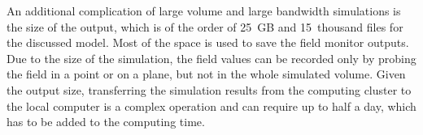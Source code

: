 An additional complication of large volume and large bandwidth simulations is the size of the output, which is of the order of 25~GB and 15~thousand files for the discussed model. Most of the space is used to save the field monitor outputs. Due to the size of the simulation, the field values can be recorded only by probing the field in a point or on a plane, but not in the whole simulated volume. Given the output size, transferring the simulation results from the computing cluster to the local computer is  a complex operation and can require up to half a day, which has to be added to the computing time.

\begin{figure}[!b]
\centering
{}
\hspace{2mm}
\hspace{2mm}

\end{figure}
